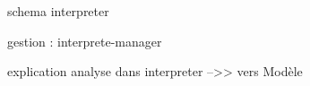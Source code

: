 
\begin{frame}
schema interpreter
\end{frame}

\begin{frame}
gestion : interprete-manager
\end{frame}

explication analyse dans interpreter -->> vers Modèle

